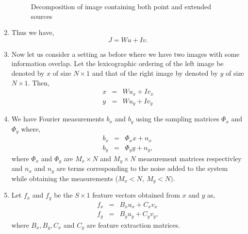 \begin{enumerate}
\begin{figure}[b!]
{		}
		\hspace{0.1in}
\caption [Decomposition of image containing both point and extended sources]{Decomposition of image containing both point and extended sources}
\label{fig:expt41}
\end{figure}
\item Thus we have,
\begin{equation}
	J = W u + I v.
\end{equation} 
\item Now let us consider a setting as before where we have two images with some information overlap. Let the lexicographic ordering of the left image be denoted by $x$ of size $N \times 1$ and that of the right image by denoted by $y$ of size $N \times 1$. Then,
\begin{eqnarray}
	x &=& Wu_x + Iv_x \\
	y  &=& Wu_y + Iv_y	
\end{eqnarray}
\item We have Fourier measurements $b_x$ and $b_y$ using the sampling matrices $\Phi_x$ and $\Phi_y$ where,
	\begin{eqnarray}
  b_x &=& \Phi_x x  + n_x\\
  b_y   &=& \Phi_y y + n_y,
  \end{eqnarray}
 where $\Phi_x$ and $\Phi_y$ are $M_x \times N$ and $M_y \times N$ measurement matrices respectivley and $n_x$ and $n_y$ are terms corresponding to the noise added to the system while obtaining the measurements ($M_x < N, \ M_y < N)$.
 
\item Let $f_x$ and $f_y$ be the $S \times 1$ feature vectors obtained from $x$ and $y$ as,
\begin{eqnarray}
f_x &=& B_x u_x + C_x v_x\\
f_y &=& B_y u_y + C_y v_y,
\label{eq:mix}
\end{eqnarray}
where $B_x, B_y, C_x$ and $C_y$ are feature extraction matrices.


\end{enumerate}
